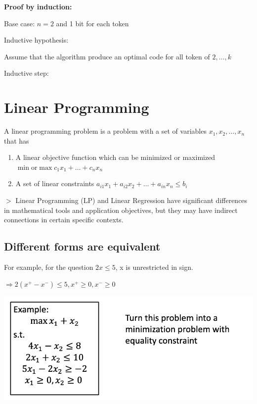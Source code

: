 \documentclass[12pt,a4paper]{article}
\newcommand{\remark}[1]{
    $>$ {\color{blue} #1}
}
\begin{document}
\textbf{Proof by induction:}

Base case: $n=2$ and 1 bit for each token

Inductive hypothesis: 

Assume that the algorithm produce an optimal code for all token of $2,\dots,k$

Inductive step:

\section*{Linear Programming}

A linear programming problem is a problem with a set of variables \(x_1, x_2, \dots, x_n\) that has

\begin{enumerate}
    \item A linear objective function which can be minimized or maximized \\ 
            \(\min \text{or} \max c_1x_1+\dots+c_nx_n\)
    \item A set of linear constraints \(a_{i1}x_1 + a_{i2}x_2 + \dots + a_{in}x_n \leq b_i\) 
\end{enumerate}

\remark{Linear Programming (LP) and Linear Regression have significant differences in mathematical tools and application objectives, but they may have indirect connections in certain specific contexts.}

\subsection*{Different forms are equivalent}

For example, for the question \(2x \leq 5\), x is unrestricted in sign.

$\Rightarrow 2(x^+ - x^-) \leq 5, x^+ \geq 0,x^- \geq 0$

\includegraphics[width=\textwidth]{./images/lp_turn.png}
\end{document}
